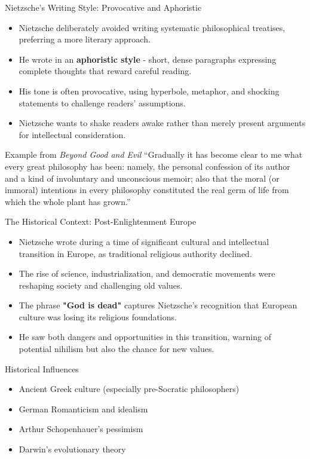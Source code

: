 \documentclass{beamer}
\begin{document}
\begin{frame}{Nietzsche's Writing Style: Provocative and Aphoristic}
\begin{itemize}
\item Nietzsche deliberately avoided writing systematic philosophical treatises, preferring a more literary approach.
\item He wrote in an \textbf{aphoristic style} - short, dense paragraphs expressing complete thoughts that reward careful reading.
\item His tone is often provocative, using hyperbole, metaphor, and shocking statements to challenge readers' assumptions.
\item Nietzsche wants to shake readers awake rather than merely present arguments for intellectual consideration.
\end{itemize}

\begin{exampleblock}{Example from \textit{Beyond Good and Evil}}
``Gradually it has become clear to me what every great philosophy has been: namely, the personal confession of its author and a kind of involuntary and unconscious memoir; also that the moral (or immoral) intentions in every philosophy constituted the real germ of life from which the whole plant has grown.''
\end{exampleblock}
\end{frame}


\begin{frame}{The Historical Context: Post-Enlightenment Europe}
    \begin{itemize}
    \item Nietzsche wrote during a time of significant cultural and intellectual transition in Europe, as traditional religious authority declined.
    \item The rise of science, industrialization, and democratic movements were reshaping society and challenging old values.
    \item The phrase \textbf{"God is dead"} captures Nietzsche's recognition that European culture was losing its religious foundations.
    \item He saw both dangers and opportunities in this transition, warning of potential nihilism but also the chance for new values.
    \end{itemize}
    
    \begin{block}{Historical Influences}
    \begin{itemize}
    \item Ancient Greek culture (especially pre-Socratic philosophers)
    \item German Romanticism and idealism
    \item Arthur Schopenhauer's pessimism
    \item Darwin's evolutionary theory
    \end{itemize}
    \end{block}
    \end{frame}
    
\end{document}
